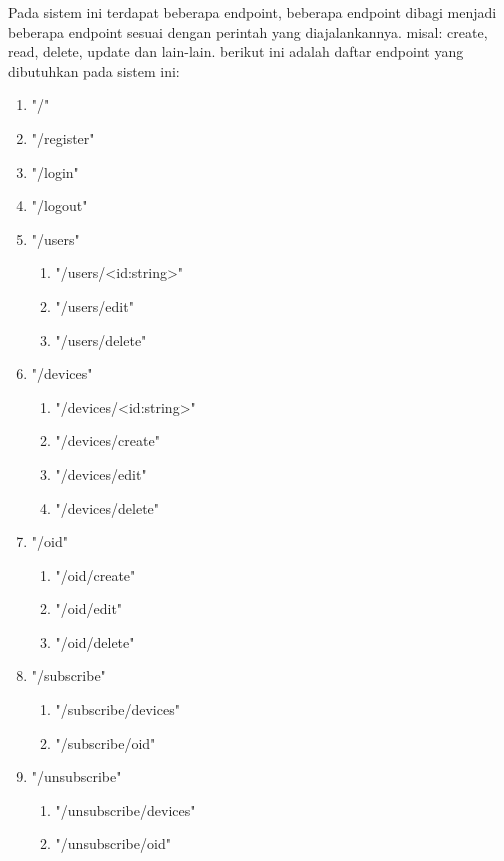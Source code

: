             	Pada sistem ini terdapat beberapa endpoint, beberapa endpoint dibagi menjadi beberapa endpoint sesuai dengan perintah yang diajalankannya. misal: create, read, delete, update dan lain-lain. berikut ini adalah daftar endpoint yang dibutuhkan pada sistem ini:
            	\begin{enumerate}
            		\item "/"
            		\item "/register"
            		\item "/login"
					\item "/logout"
					\item "/users"
					\begin{enumerate}
						\item "/users/<id:string>"
						\item "/users/edit"
						\item "/users/delete"
					\end{enumerate}
					\item "/devices"
					\begin{enumerate}
						\item "/devices/<id:string>"
						\item "/devices/create"
						\item "/devices/edit"
						\item "/devices/delete"
					\end{enumerate}
					\item "/oid"
					\begin{enumerate}
						\item "/oid/create"
						\item "/oid/edit"
						\item "/oid/delete"
					\end{enumerate}
					\item "/subscribe"
					\begin{enumerate}
						\item "/subscribe/devices"
						\item "/subscribe/oid"
					\end{enumerate}
					\item "/unsubscribe"
					\begin{enumerate}
						\item "/unsubscribe/devices"
						\item "/unsubscribe/oid"
					\end{enumerate}           		
            	\end{enumerate}
            	
